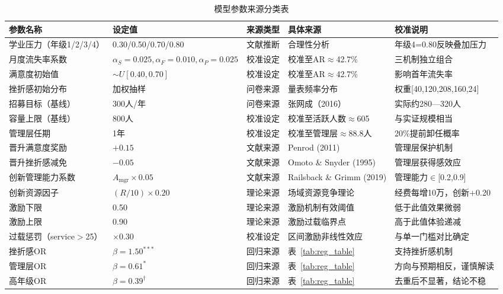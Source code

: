 \documentclass[12pt,a4paper]{article}
\begin{document}
\begin{table}[H]
\centering
\scriptsize
\caption{模型参数来源分类表}
\label{tab:param_source}
\begin{tabular}{p{2.8cm}p{1.8cm}p{2.5cm}p{2.2cm}p{2.2cm}}
\toprule
参数名称 & 设定值 & 来源类型 & 具体来源 & 校准说明 \\
\midrule
学业压力（年级1/2/3/4） & 0.30/0.50/0.70/0.80 & 文献推断 & 合理性分析 & 年级4=0.80反映叠加压力 \\
月度流失率系数 & $\alpha_S=0.025,\alpha_F=0.010,\alpha_P=0.025$ & 校准设定 & 校准至AR$\approx$42.7\% & 三机制独立组合 \\
满意度初始值 & $\sim U[0.40,0.70]$ & 校准设定 & 校准至AR$\approx$42.7\% & 影响首年流失率 \\
挫折感初始分布 & 加权抽样 & 问卷来源 & 量表频率分布 & 权重[40,120,208,160,24] \\
招募目标（基线） & 300人/年 & 问卷来源 & 张网成（2016） & 实际约280—320人 \\
容量上限（基线） & 800人 & 校准设定 & 校准至活跃人数$\approx$605 & 与实证规模相当 \\
管理层任期 & 1年 & 校准设定 & 校准至管理层$\approx$88.8人 & 20\%提前卸任概率 \\
晋升满意度奖励 & $+0.15$ & 文献来源 & Penrod (2011) & 管理层保护机制 \\
晋升挫折感减免 & $-0.05$ & 文献来源 & Omoto \& Snyder (1995) & 管理层获得感效应 \\
创新管理能力系数 & $A_{\text{mgr}}\times0.05$ & 文献来源 & Railsback \& Grimm (2019) & 管理能力$\in$[0.2,0.9] \\
创新资源因子 & $(R/10)\times0.20$ & 理论来源 & 场域资源竞争理论 & 经费每增10万，创新+0.20 \\
激励下限 & 0.50 & 理论来源 & 激励机制有效阈值 & 低于此值效果微弱 \\
激励上限 & 0.90 & 理论来源 & 激励过载临界点 & 高于此值体验递减 \\
过载惩罚（service$>$25） & $\times0.30$ & 校准设定 & 区间激励非线性效应 & 与单一门槛对比确定 \\
挫折感OR & $\beta=1.50^{***}$ & 回归来源 & 表~\ref{tab:reg_table} & 支持挫折感机制 \\
管理层OR & $\beta=0.61^{*}$ & 回归来源 & 表~\ref{tab:reg_table} & 方向与预期相反，谨慎解读 \\
高年级OR & $\beta=0.39^{\dagger}$ & 回归来源 & 表~\ref{tab:reg_table} & 去重后不显著，结论不稳 \\
\bottomrule
\end{tabular}
\end{table}
\end{document}
